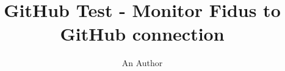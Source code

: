 \documentclass[11pt]{book}
\title{GitHub Test - Monitor Fidus to GitHub connection}
\author{An Author}
\begin{document}
\maketitle
\def\title#1{\chapter{#1}}
\tableofcontents

        
        
        
        
        
        
\end{document}
